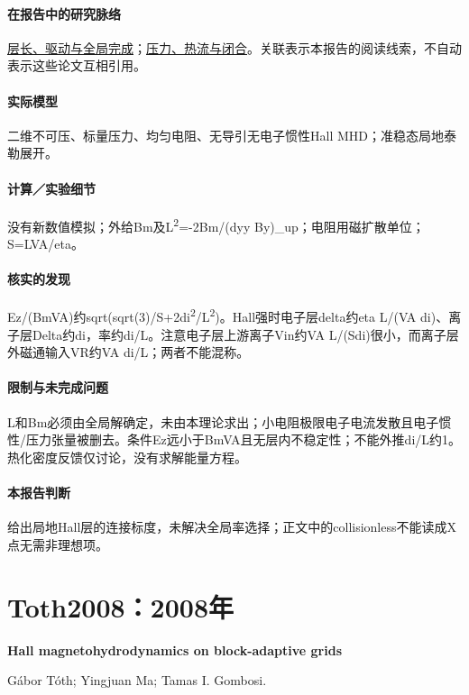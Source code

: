 \documentclass[UTF8,a4paper,11pt,openany,fontset=fandol]{ctexbook}
\begin{document}
\paragraph{在报告中的研究脉络}\hyperref[story:global]{层长、驱动与全局完成}；\hyperref[story:closure]{压力、热流与闭合}。关联表示本报告的阅读线索，不自动表示这些论文互相引用。

\paragraph{实际模型}二维不可压、标量压力、均匀电阻、无导引无电子惯性Hall MHD；准稳态局地泰勒展开。

\paragraph{计算／实验细节}没有新数值模拟；外给Bm及L\textsuperscript{2}=-2Bm/(dyy By)\_up；电阻用磁扩散单位；S=LVA/eta。

\paragraph{核实的发现}Ez/(BmVA)约sqrt(sqrt(3)/S+2di\textsuperscript{2}/L\textsuperscript{2})。Hall强时电子层delta约eta L/(VA di)、离子层Delta约di，率约di/L。注意电子层上游离子Vin约VA L/(Sdi)很小，而离子层外磁通输入VR约VA di/L；两者不能混称。

\paragraph{限制与未完成问题}L和Bm必须由全局解确定，未由本理论求出；小电阻极限电子电流发散且电子惯性/压力张量被删去。条件Ez远小于BmVA且无层内不稳定性；不能外推di/L约1。热化密度反馈仅讨论，没有求解能量方程。

\paragraph{本报告判断}给出局地Hall层的连接标度，未解决全局率选择；正文中的collisionless不能读成X点无需非理想项。

\section{Toth2008：2008年}\label{paper:Toth2008}

\textbf{Hall magnetohydrodynamics on block-adaptive grids}\citep{Toth2008}\

Gábor Tóth;  Yingjuan Ma;  Tamas I. Gombosi.
\end{document}
